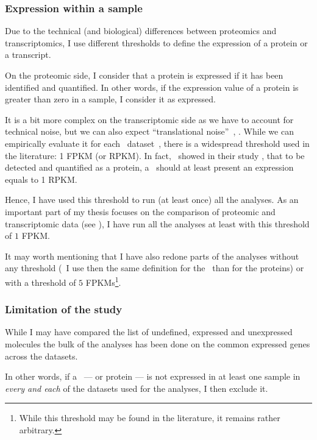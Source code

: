 \subsubsection{Expression within a sample}
Due to the technical (and biological) differences between proteomics and
transcriptomics, I use different thresholds to define the expression of a protein
or a transcript.

On the proteomic side, I consider that a protein is expressed if it has been
identified and quantified. In other words, if the expression value of a protein
is greater than zero in a sample, I consider it as expressed.

\label{subsubsec:exprTrans}
It is a bit more complex on the transcriptomic side as we have to account for
technical noise, but we can also expect \enquote{translational noise}~,
.
While we can empirically evaluate it for each \Rnaseq\
dataset~,
there is a widespread threshold used in the literature:
1 \gls{FPKM} (or \gls{RPKM}).
In fact,~\citet{Hebenstreit:2011} showed in their study
,
that to be detected and quantified as a protein,
a \mRNA\ should at least present an expression equals to 1 \gls{RPKM}.

Hence, I have used this threshold to run (at least once) all the analyses.
As an important part of my thesis focuses on
the comparison of proteomic and transcriptomic data (see ),
I have run all the analyses at least with this threshold of $1$ \gls{FPKM}.

It may worth mentioning that I have also redone parts of the analyses without
any threshold (\ie\ I use then the same definition for the \mRNAs\ than for the
proteins) or with a threshold of $5$ \glspl{FPKM}\footnote{While this threshold
may be found in the literature, it remains rather arbitrary.}.

\subsubsection{Limitation of the study}
While I may have compared the list of
undefined, expressed and unexpressed molecules
the bulk of the analyses has been done on the common expressed genes across
the datasets.

In other words, if a \mRNA\ --- or protein --- is not expressed in at least
one sample in \emph{every and each} of the datasets used for the analyses,
I then exclude it.


